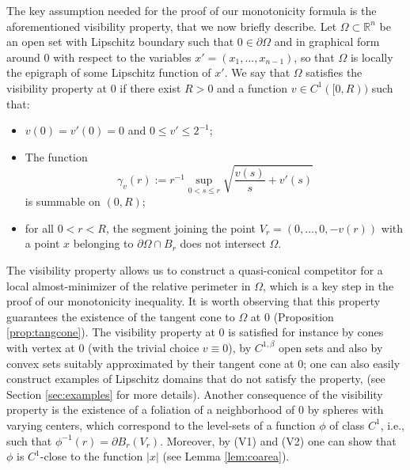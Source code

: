 \documentclass[a4paper,reqno,11pt]{amsart}
\newcommand{\R}{\mathbb{R}}
\newcommand{\de}{\partial}
\begin{document}
The key assumption needed for the proof of our monotonicity formula is the aforementioned visibility property, that we now briefly describe. Let $\Omega \subset \R^n$ be an open set with Lipschitz boundary such that $0 \in \de \Omega$ and in graphical form around $0$ with respect to the variables $x' = (x_1,...,x_{n-1})$, so that $\Omega$ is locally the epigraph of some Lipschitz function of $x'$. We say that $\Omega$ satisfies the visibility property at $0$ if there exist $R > 0$ and a function $v \in C^1([0,R))$ such that:
\begin{itemize}
	\item[(V1)] $v(0)=v'(0)=0$ and $0\le v' \le 2^{-1}$;
	\item[(V2)] The function
	\[
	\gamma_{v}(r) := r^{-1}\sup_{0<s\le r} \sqrt{\frac{v(s)}{s}+v'(s)}
	\]
	is summable on $(0,R)$;
	\item[(V3)] for all $0 < r < R$, the segment joining the point $V_r = (0,\dots,0,-v(r))$ with a point $x$ belonging to $\de \Omega \cap B_{r}$ does not intersect $\Omega$.
\end{itemize}
The visibility property allows us to construct a quasi-conical competitor for a local almost-minimizer of the relative perimeter in $\Omega$, which is a key step in the proof of our monotonicity inequality. It is worth observing that this property guarantees the existence of the tangent cone to $\Omega$ at $0$ (Proposition \ref{prop:tangcone}). %
The visibility property at $0$ is satisfied for instance by cones with vertex at $0$ (with the trivial choice $v \equiv 0$), by $C^{1,\beta}$ open sets and also by convex sets suitably approximated by their tangent cone at $0$; one can also easily construct examples of Lipschitz domains that do not satisfy the property, (see Section \ref{sec:examples} for more details).
Another consequence of the visibility property is the existence of a foliation of a neighborhood of $0$ by spheres with varying centers, which correspond to the level-sets of a function $\phi$ of class $C^1$, i.e., such that $\phi^{-1}(r) = \de B_r(V_r)$. Moreover, by (V1) and (V2) one can show that $\phi$ is $C^1$-close to the function $|x|$ (see Lemma \ref{lem:coarea}). 
\end{document}
